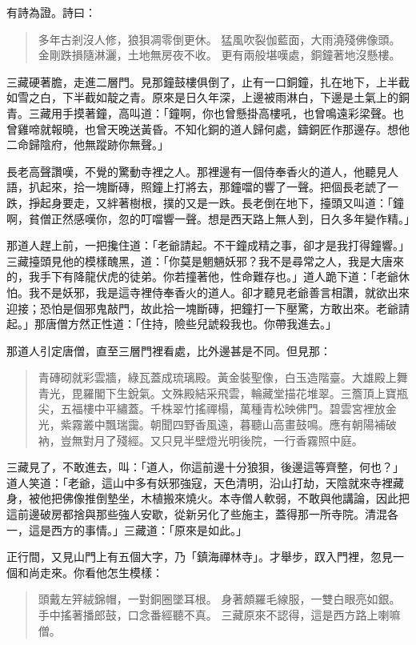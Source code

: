 有詩為證。詩曰：
\begin{quote}
多年古剎沒人修，狼狽凋零倒更休。
猛風吹裂伽藍面，大雨澆殘佛像頭。
金剛跌損隨淋灑，土地無房夜不收。
更有兩般堪嘆處，銅鐘著地沒懸樓。
\end{quote}

三藏硬著膽，走進二層門。見那鐘鼓樓俱倒了，止有一口銅鐘，扎在地下，上半截如雪之白，下半截如靛之青。原來是日久年深，上邊被雨淋白，下邊是土氣上的銅青。三藏用手摸著鐘，高叫道：「鐘啊，你也曾懸掛高樓吼，也曾鳴遠彩梁聲。也曾雞啼就報曉，也曾天晚送黃昏。不知化銅的道人歸何處，鑄銅匠作那邊存。想他二命歸陰府，他無蹤跡你無聲。」

長老高聲讚嘆，不覺的驚動寺裡之人。那裡邊有一個侍奉香火的道人，他聽見人語，扒起來，拾一塊斷磚，照鐘上打將去，那鐘噹的響了一聲。把個長老諕了一跌，掙起身要走，又絆著樹根，撲的又是一跌。長老倒在地下，擡頭又叫道：「鐘啊，貧僧正然感嘆你，忽的叮噹響一聲。想是西天路上無人到，日久多年變作精。」

那道人趕上前，一把攙住道：「老爺請起。不干鐘成精之事，卻才是我打得鐘響。」三藏擡頭見他的模樣醜黑，道：「你莫是魍魎妖邪？我不是尋常之人，我是大唐來的，我手下有降龍伏虎的徒弟。你若撞著他，性命難存也。」道人跪下道：「老爺休怕。我不是妖邪，我是這寺裡侍奉香火的道人。卻才聽見老爺善言相讚，就欲出來迎接；恐怕是個邪鬼敲門，故此拾一塊斷磚，把鐘打一下壓驚，方敢出來。老爺請起。」那唐僧方然正性道：「住持，險些兒諕殺我也。你帶我進去。」

那道人引定唐僧，直至三層門裡看處，比外邊甚是不同。但見那：
\begin{quote}
青磚砌就彩雲牆，綠瓦蓋成琉璃殿。黃金裝聖像，白玉造階臺。大雄殿上舞青光，毘羅閣下生銳氣。文殊殿結采飛雲，輪藏堂描花堆翠。三簷頂上寶瓶尖，五福樓中平繡蓋。千株翠竹搖禪榻，萬種青松映佛門。碧雲宮裡放金光，紫霧叢中飄瑞靄。朝聞四野香風遠，暮聽山高畫鼓鳴。應有朝陽補破衲，豈無對月了殘經。又只見半壁燈光明後院，一行香霧照中庭。
\end{quote}

三藏見了，不敢進去，叫：「道人，你這前邊十分狼狽，後邊這等齊整，何也？」道人笑道：「老爺，這山中多有妖邪強寇，天色清明，沿山打劫，天陰就來寺裡藏身，被他把佛像推倒墊坐，木植搬來燒火。本寺僧人軟弱，不敢與他講論，因此把這前邊破房都捨與那些強人安歇，從新另化了些施主，蓋得那一所寺院。清混各一，這是西方的事情。」三藏道：「原來是如此。」

正行間，又見山門上有五個大字，乃「鎮海禪林寺」。才舉步，䟕入門裡，忽見一個和尚走來。你看他怎生模樣：
\begin{quote}
頭戴左笄絨錦帽，一對銅圈墜耳根。
身著頗羅毛線服，一雙白眼亮如銀。
手中搖著播郎鼓，口念番經聽不真。
三藏原來不認得，這是西方路上喇嘛僧。
\end{quote}

